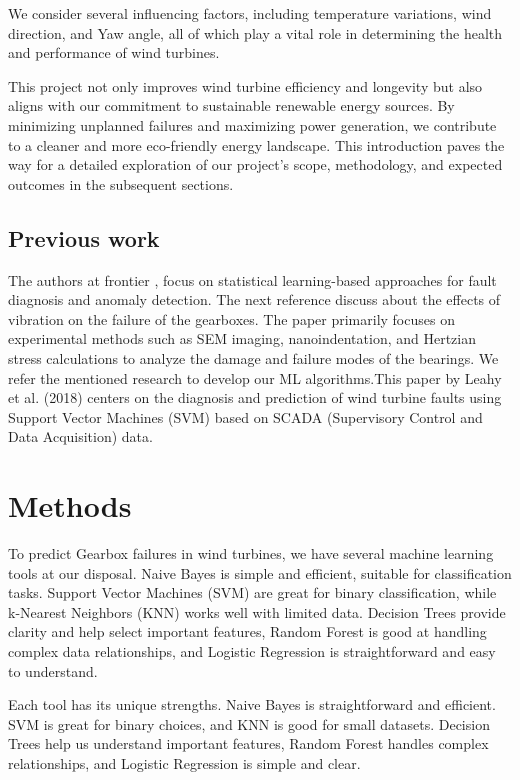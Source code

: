 \documentclass[11pt,a4paper]{article}
\begin{document}
We consider several influencing factors, including temperature variations, wind direction, and Yaw angle, all of which play a vital role in determining the health and performance of wind turbines.

This project not only improves wind turbine efficiency and longevity but also aligns with our commitment to sustainable renewable energy sources. By minimizing unplanned failures and maximizing power generation, we contribute to a cleaner and more eco-friendly energy landscape. This introduction paves the way for a detailed exploration of our project’s scope, methodology, and expected outcomes in the subsequent sections.

\subsection*{Previous work} %
The authors at frontier \cite{reference2}, focus on statistical learning-based approaches for fault diagnosis and anomaly detection. The next reference \cite{reference1} discuss about the effects of vibration on the failure of the gearboxes. The paper \cite{reference3} primarily focuses on experimental methods such as SEM imaging, nanoindentation, and Hertzian stress calculations to analyze the damage and failure modes of the bearings. We refer the mentioned research to develop our ML algorithms.This paper \cite{reference4} by Leahy et al. (2018) centers on the diagnosis and prediction of wind turbine faults using Support Vector Machines (SVM) based on SCADA (Supervisory Control and Data Acquisition) data. 


\section{Methods}
To predict Gearbox failures in wind turbines, we have several machine learning tools at our disposal. Naive Bayes is simple and efficient, suitable for classification tasks. Support Vector Machines (SVM) are great for binary classification, while k-Nearest Neighbors (KNN) works well with limited data. Decision Trees provide clarity and help select important features, Random Forest is good at handling complex data relationships, and Logistic Regression is straightforward and easy to understand.

Each tool has its unique strengths. Naive Bayes is straightforward and efficient. SVM is great for binary choices, and KNN is good for small datasets. Decision Trees help us understand important features, Random Forest handles complex relationships, and Logistic Regression is simple and clear.
\end{document}
